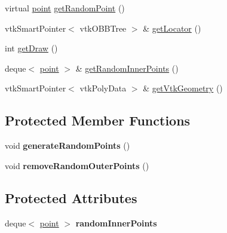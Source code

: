 \begin{DoxyCompactItemize}
\item 
virtual \hyperlink{structpoint}{point} \hyperlink{class_intersection_vascularized_domain_a39e0fd3443fed3fecf4ecc799e39baa2}{get\+Random\+Point} ()
\item 
vtk\+Smart\+Pointer$<$ vtk\+O\+B\+B\+Tree $>$ \& \hyperlink{class_intersection_vascularized_domain_a1188cff5b710e8281a9cecf998532a20}{get\+Locator} ()
\item 
int \hyperlink{class_intersection_vascularized_domain_a451cea01fadfed6f9a1118755c36f16b}{get\+Draw} ()
\item 
deque$<$ \hyperlink{structpoint}{point} $>$ \& \hyperlink{class_intersection_vascularized_domain_afa0103c0c3ed989e1b67e50d14684321}{get\+Random\+Inner\+Points} ()
\item 
vtk\+Smart\+Pointer$<$ vtk\+Poly\+Data $>$ \& \hyperlink{class_intersection_vascularized_domain_aacdc4a4263423e8c8dd992ba4f00f826}{get\+Vtk\+Geometry} ()
\end{DoxyCompactItemize}
\subsection*{Protected Member Functions}
\begin{DoxyCompactItemize}
\item 
void {\bfseries generate\+Random\+Points} ()\hypertarget{class_intersection_vascularized_domain_a9f49c20ae3e45f5c3a45d95c7a83f564}{}\label{class_intersection_vascularized_domain_a9f49c20ae3e45f5c3a45d95c7a83f564}

\item 
void {\bfseries remove\+Random\+Outer\+Points} ()\hypertarget{class_intersection_vascularized_domain_a835ac8aeef4b5c2731ca8b0f2c36e727}{}\label{class_intersection_vascularized_domain_a835ac8aeef4b5c2731ca8b0f2c36e727}

\end{DoxyCompactItemize}
\subsection*{Protected Attributes}
\begin{DoxyCompactItemize}
\item 
deque$<$ \hyperlink{structpoint}{point} $>$ {\bfseries random\+Inner\+Points}\hypertarget{class_intersection_vascularized_domain_afdb89cfb5da3abb20351ece21dc500d0}{}\label{class_intersection_vascularized_domain_afdb89cfb5da3abb20351ece21dc500d0}

\end{DoxyCompactItemize}
